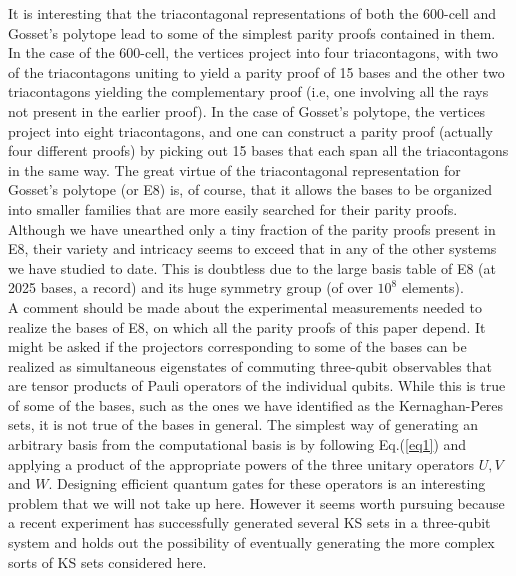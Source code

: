 It is interesting that the triacontagonal representations of both the 600-cell and Gosset's polytope lead to some of the simplest parity proofs contained in them. In the case of the 600-cell, the vertices project into four triacontagons, with two of the triacontagons uniting to yield a parity proof of 15 bases and the other two triacontagons yielding the complementary proof (i.e, one involving all the rays not present in the earlier proof). In the case of Gosset's polytope, the vertices project into eight triacontagons, and one can construct a parity proof (actually four different proofs) by picking out 15 bases that each span all the triacontagons in the same way. The great virtue of the triacontagonal representation for Gosset's polytope (or E8) is, of course, that it allows the bases to be organized into smaller families that are more easily searched for their parity proofs. Although we have unearthed only a tiny fraction of the parity proofs present in E8, their variety and intricacy seems to exceed that in any of the other systems we have studied to date. This is doubtless due to the large basis table of E8 (at 2025 bases, a record) and its huge symmetry group (of over $10^{8}$ elements).\\

A comment should be made about the experimental measurements needed to realize the bases of E8, on which all the parity proofs of this paper depend. It might be asked if the projectors corresponding to some of the bases can be realized as simultaneous eigenstates of commuting three-qubit observables that are tensor products of Pauli operators of the individual qubits. While this is true of some of the bases, such as the ones we have identified as the Kernaghan-Peres sets, it is not true of the bases in general. The simplest way of generating an arbitrary basis from the computational basis is by following Eq.(\ref{eq1}) and applying a product of the appropriate powers of the three unitary operators $U,V$ and $W$. Designing efficient quantum gates for these operators is an interesting problem that we will not take up here. However it seems worth pursuing because a recent experiment\cite{canas2014b} has successfully generated several KS sets in a three-qubit system and holds out the possibility of eventually generating the more complex sorts of KS sets considered here.\\

